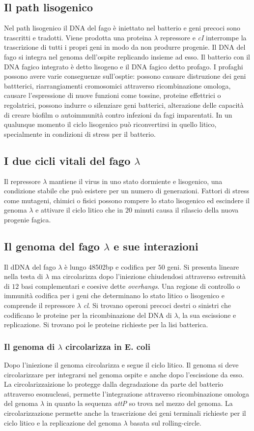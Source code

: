 \subsection{Il path lisogenico}
Nel path lisogenico il DNA del fago \`e iniettato nel batterio e geni precoci sono trascritti e tradotti. Viene prodotta una proteina $\lambda$ repressore e \emph{cI} interrompe la
trascrizione di tutti i propri geni in modo da non produrre progenie. Il DNA del fago si integra nel genoma dell'ospite replicando insieme ad esso. Il batterio con il DNA fagico
integrato \`e detto lisogeno e il DNA fagico detto profago. I profaghi possono avere varie conseguenze sull'osptie: possono causare distruzione dei geni battterici, riarrangiamenti 
cromosomici attraverso ricombinazione omologa, causare l'espressione di nuove funzioni come tossine, proteine effettrici o regolatrici, possono indurre o silenziare geni batterici, 
alterazione delle capacit\`a di creare biofilm o autoimmunit\`a contro infezioni da fagi imparentati. In un qualunque momento il ciclo lisogenico pu\`o riconvertirsi in quello litico, 
specialmente in condizioni di stress per il batterio. 
\subsection{I due cicli vitali del fago $\lambda$}
Il repressore $\lambda$ mantiene il virus in uno stato dormiente e lisogenico, una condizione stabile che pu\`o esistere per un numero di generazioni. Fattori di stress come 
mutageni, chimici o fisici possono rompere lo stato lisogenico ed escindere il genoma $\lambda$ e attivare il ciclo litico che in $20$ minuti causa il rilascio della nuova progenie
fagica. 
\subsection{Il genoma del fago $\lambda$ e sue interazioni}
Il dDNA del fago $\lambda$ \`e lungo \num{48502}\si{bp} e codifica per $50$ geni. Si presenta lineare nella testa di $\lambda$ ma circolarizza dopo l'iniezione chiudendosi attraverso 
estremit\`a di $12$ basi complementari e coesive dette \emph{overhangs}. Una regione di controllo o immunit\`a codifica per i geni che determinano lo stato litico o lisogenico e 
comprende il repressore $\lambda$ \emph{cl}. Si trovano operoni precoci destri o sinistri che codificano le proteine per la ricombinazione del DNA di $\lambda$, la sua escissione e 
replicazione. Si trovano poi le proteine richieste per la lisi batterica. 
\subsubsection{Il genoma di $\lambda$ circolarizza in E. coli}
Dopo l'iniezione il genoma circolarizza e segue il ciclo litico. Il genoma si deve circolarizzare per integrarsi nel genoma ospite e anche dopo l'escissione da esso. La 
circolarizzaizione lo protegge dalla degradazione da parte del batterio attraverso esonucleasi, permette l'integrazione attraverso ricombinazione omologa del genoma $\lambda$ in quanto 
la sequenza \emph{attP} so trova nel mezzo del genoma. La circolarizzazione permette anche la trascrizione dei geni terminali richieste per il ciclo litico e la replicazione del genoma
$\lambda$ basata sul rolling-circle. 
